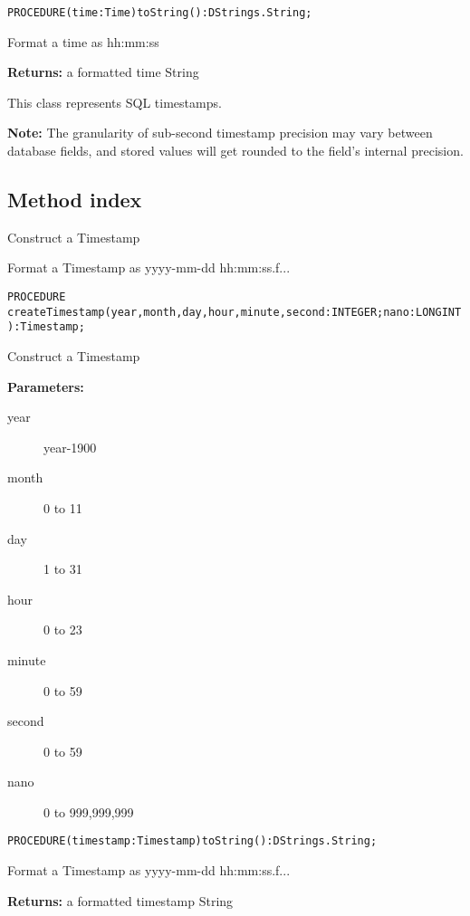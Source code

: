                     



\verb'PROCEDURE(time:Time)toString():DStrings.String;'

     Format a time as hh:mm:ss 

     {\bf Returns: } 
          a formatted time String 


\renewcommand{\CurClass}{Timestamp}
\Class{}

This class represents SQL timestamps.

{\bf Note: }
The granularity of sub-second timestamp precision may vary between database fields, and stored values will get rounded to
the field's internal precision. 

\subsection{Method index}

\begin{description}
     Construct a Timestamp 

     Format a Timestamp as yyyy-mm-dd hh:mm:ss.f... 
\end{description}



\verb'PROCEDURE createTimestamp(year,month,day,hour,minute,second:INTEGER;nano:LONGINT):Timestamp;'

     Construct a Timestamp 

     {\bf Parameters: }
\begin{description}
\item[year] year-1900 
\item[month] 0 to 11 
\item[day] 1 to 31 
\item[hour] 0 to 23 
\item[minute] 0 to 59 
\item[second] 0 to 59 
\item[nano] 0 to 999,999,999 
\end{description}



\verb'PROCEDURE(timestamp:Timestamp)toString():DStrings.String;'

     Format a Timestamp as yyyy-mm-dd hh:mm:ss.f... 

     {\bf Returns: } 
          a formatted timestamp String 


